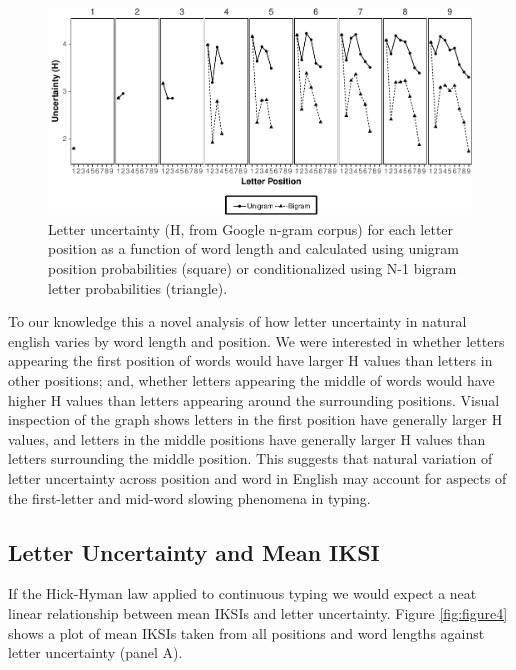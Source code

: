 \documentclass[,man,floatsintext]{apa6}
\begin{document}
\begin{figure}
\centering
\includegraphics{v2-manuscript_files/figure-latex/figure3-1.pdf}
\caption{\label{fig:figure3}Letter uncertainty (H, from Google n-gram corpus) for each letter position as a function of word length and calculated using unigram position probabilities (square) or conditionalized using N-1 bigram letter probabilities (triangle).}
\end{figure}



To our knowledge this a novel analysis of how letter uncertainty in natural english varies by word length and position. We were interested in whether letters appearing the first position of words would have larger H values than letters in other positions; and, whether letters appearing the middle of words would have higher H values than letters appearing around the surrounding positions. Visual inspection of the graph shows letters in the first position have generally larger H values, and letters in the middle positions have generally larger H values than letters surrounding the middle position. This suggests that natural variation of letter uncertainty across position and word in English may account for aspects of the first-letter and mid-word slowing phenomena in typing.

\hypertarget{letter-uncertainty-and-mean-iksi}{%
\subsection{Letter Uncertainty and Mean IKSI}\label{letter-uncertainty-and-mean-iksi}}

If the Hick-Hyman law applied to continuous typing we would expect a neat linear relationship between mean IKSIs and letter uncertainty. Figure \ref{fig:figure4} shows a plot of mean IKSIs taken from all positions and word lengths against letter uncertainty (panel A).
\end{document}
